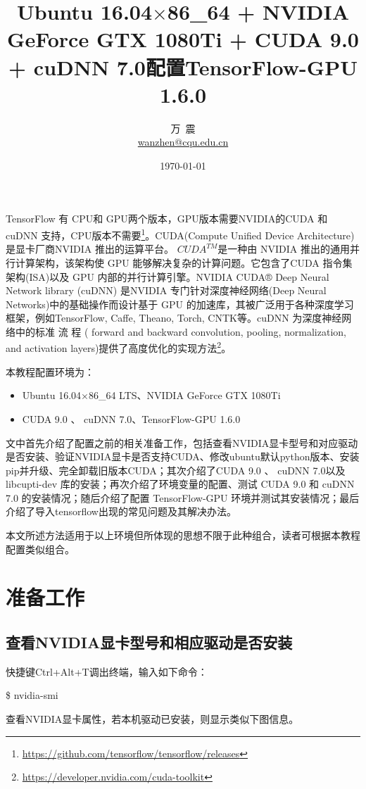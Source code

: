 \documentclass[11pt,a4paper]{ctexart}
\begin{document}
\title{Ubuntu 16.04$ \times$86\_64 + NVIDIA GeForce GTX 1080Ti +  CUDA 9.0 + cuDNN 7.0配置TensorFlow-GPU 1.6.0 }  
\author{\kaishu\Large 万\ 震\\ \href{mailto:wanzhen@cqu.edu.cn}{wanzhen@cqu.edu.cn}}
\date{\today}
\maketitle

TensorFlow 有 CPU和 GPU两个版本，GPU版本需要NVIDIA的CUDA 和 cuDNN 支持，CPU版本不需要\footnote{\url{https://github.com/tensorflow/tensorflow/releases}}。CUDA(Compute Unified Device Architecture)是显卡厂商NVIDIA 推出的运算平台。 $CUDA^{TM}$是一种由 NVIDIA 推出的通用并行计算架构，该架构使 GPU 能够解决复杂的计算问题。它包含了CUDA 指令集架构(ISA)以及 GPU 内部的并行计算引擎。NVIDIA CUDA® Deep Neural Network library (cuDNN) 是NVIDIA 专门针对深度神经网络(Deep Neural Networks)中的基础操作而设计基于 GPU 的加速库，其被广泛用于各种深度学习框架，例如TensorFlow, Caffe, Theano, Torch, CNTK等。cuDNN 为深度神经网络中的标准 流 程 ( forward and backward convolution, pooling, normalization, and activation layers)提供了高度优化的实现方法\footnote{\url{https://developer.nvidia.com/cuda-toolkit}}。

本教程配置环境为：
\vspace{-0.3cm}
\begin{itemize}
\item Ubuntu 16.04$ \times$86\_64  LTS、NVIDIA GeForce GTX 1080Ti 
\item CUDA 9.0 、 cuDNN 7.0、TensorFlow-GPU 1.6.0
\end{itemize}
文中首先介绍了配置之前的相关准备工作，包括查看NVIDIA显卡型号和对应驱动是否安装、验证NVIDIA显卡是否支持CUDA、修改ubuntu默认python版本、安装pip并升级、完全卸载旧版本CUDA；其次介绍了CUDA 9.0 、 cuDNN 7.0以及libcupti-dev 库的安装；再次介绍了环境变量的配置、测试 CUDA 9.0 和 cuDNN 7.0 的安装情况；随后介绍了配置 TensorFlow-GPU 环境并测试其安装情况；最后介绍了导入tensorflow出现的常见问题及其解决办法。

本文所述方法适用于以上环境但所体现的思想不限于此种组合，读者可根据本教程配置类似组合。

\section{准备工作}
\subsection{查看NVIDIA显卡型号和相应驱动是否安装}
快捷键Ctrl+Alt+T调出终端，输入如下命令：
\begin{center}
\$ nvidia-smi
\end{center}
查看NVIDIA显卡属性，若本机驱动已安装，则显示类似下图信息。
\end{document}
